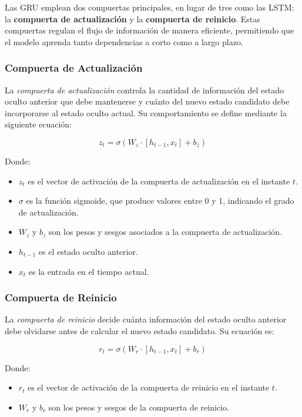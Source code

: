 Las GRU emplean dos compuertas principales, en lugar de tres como las LSTM: la \textbf{compuerta de actualización} y la \textbf{compuerta de reinicio}. Estas compuertas regulan el flujo de información de manera eficiente, permitiendo que el modelo aprenda tanto dependencias a corto como a largo plazo.

\subsubsection{Compuerta de Actualización}

La \textit{compuerta de actualización} controla la cantidad de información del estado oculto anterior que debe mantenerse y cuánto del nuevo estado candidato debe incorporarse al estado oculto actual. Su comportamiento se define mediante la siguiente ecuación:

\begin{equation}
    z_t = \sigma(W_z \cdot [h_{t-1}, x_t] + b_z)
\end{equation}

Donde:  
\begin{itemize}
    \item \(z_t\) es el vector de activación de la compuerta de actualización en el instante \(t\).  
    \item \(\sigma\) es la función sigmoide, que produce valores entre 0 y 1, indicando el grado de actualización.  
    \item \(W_z\) y \(b_z\) son los pesos y sesgos asociados a la compuerta de actualización.  
    \item \(h_{t-1}\) es el estado oculto anterior.  
    \item \(x_t\) es la entrada en el tiempo actual.
\end{itemize}

\subsubsection{Compuerta de Reinicio}

La \textit{compuerta de reinicio} decide cuánta información del estado oculto anterior debe olvidarse antes de calcular el nuevo estado candidato. Su ecuación es:

\begin{equation}
    r_t = \sigma(W_r \cdot [h_{t-1}, x_t] + b_r)
\end{equation}

Donde:  
\begin{itemize}
    \item \(r_t\) es el vector de activación de la compuerta de reinicio en el instante \(t\).  
    \item \(W_r\) y \(b_r\) son los pesos y sesgos de la compuerta de reinicio.  
\end{itemize}

